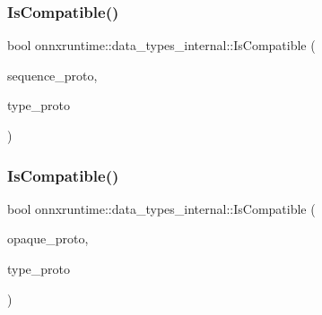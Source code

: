\mbox{\label{namespaceonnxruntime_1_1data__types__internal_a44bb8561823e33ae70b877bcd51251c8}} 
\subsubsection{\texorpdfstring{Is\+Compatible()}{IsCompatible()}\hspace{0.1cm}{\footnotesize\ttfamily [4/5]}}
{\footnotesize\ttfamily bool onnxruntime\+::data\+\_\+types\+\_\+internal\+::\+Is\+Compatible (\begin{DoxyParamCaption}\item[{const O\+N\+N\+X\+\_\+\+N\+A\+M\+E\+S\+P\+A\+C\+E\+::\+Type\+Proto\+\_\+\+Sequence \&}]{sequence\+\_\+proto,  }\item[{const O\+N\+N\+X\+\_\+\+N\+A\+M\+E\+S\+P\+A\+C\+E\+::\+Type\+Proto\+\_\+\+Sequence \&}]{type\+\_\+proto }\end{DoxyParamCaption})}

\mbox{\label{namespaceonnxruntime_1_1data__types__internal_a41fe7f3e42912d2e8db13d576b646120}} 
\subsubsection{\texorpdfstring{Is\+Compatible()}{IsCompatible()}\hspace{0.1cm}{\footnotesize\ttfamily [5/5]}}
{\footnotesize\ttfamily bool onnxruntime\+::data\+\_\+types\+\_\+internal\+::\+Is\+Compatible (\begin{DoxyParamCaption}\item[{const O\+N\+N\+X\+\_\+\+N\+A\+M\+E\+S\+P\+A\+C\+E\+::\+Type\+Proto\+\_\+\+Opaque \&}]{opaque\+\_\+proto,  }\item[{const O\+N\+N\+X\+\_\+\+N\+A\+M\+E\+S\+P\+A\+C\+E\+::\+Type\+Proto\+\_\+\+Opaque \&}]{type\+\_\+proto }\end{DoxyParamCaption})}

